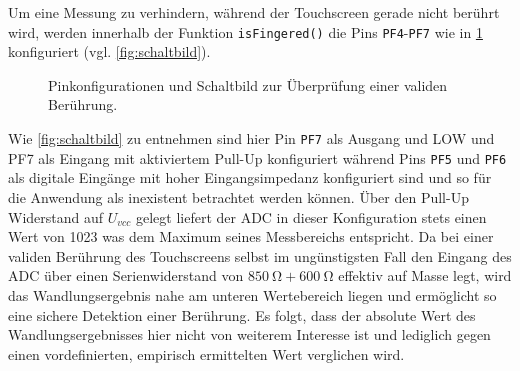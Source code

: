 		Um eine Messung zu verhindern, während der Touchscreen gerade nicht berührt wird, werden innerhalb der Funktion \texttt{isFingered()} die Pins \texttt{PF4}-\texttt{PF7} wie in \cref{fig:fingered} konfiguriert (vgl. \cref{fig:schaltbild}).
		\begin{figure}[ht]
			\centering
			\caption{Pinkonfigurationen und Schaltbild zur Überprüfung einer validen Berührung.}
			\label{fig:fingered}
		\end{figure}
		Wie \cref{fig:schaltbild} zu entnehmen sind hier Pin \texttt{PF7} als Ausgang und LOW und PF7 als Eingang mit aktiviertem Pull-Up konfiguriert während Pins \texttt{PF5} und \texttt{PF6} als digitale Eingänge mit hoher Eingangsimpedanz konfiguriert sind und so für die Anwendung als inexistent betrachtet werden können.
		Über den Pull-Up Widerstand auf \(U_{vcc}\) gelegt liefert der ADC in dieser Konfiguration stets einen Wert von 1023 was dem Maximum seines Messbereichs entspricht.
		Da bei einer validen Berührung des Touchscreens selbst im ungünstigsten Fall den Eingang des ADC über einen Serienwiderstand von \(\SI{850}{\ohm} + \SI{600}{\ohm}\) effektiv auf Masse legt, wird das Wandlungsergebnis nahe am unteren Wertebereich liegen und ermöglicht so eine sichere Detektion einer Berührung.
		Es folgt, dass der absolute Wert des Wandlungsergebnisses hier nicht von weiterem Interesse ist und lediglich gegen einen vordefinierten, empirisch ermittelten Wert verglichen wird.\par\medskip

